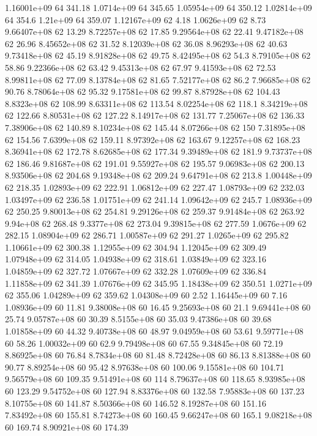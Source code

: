 1.16001e+09 64 341.18
1.0714e+09 64 345.65
1.05954e+09 64 350.12
1.02814e+09 64 354.6
1.21e+09 64 359.07
1.12167e+09 62 4.18
1.0626e+09 62 8.73
9.66407e+08 62 13.29
8.72257e+08 62 17.85
9.29564e+08 62 22.41
9.47182e+08 62 26.96
8.45652e+08 62 31.52
8.12039e+08 62 36.08
8.96293e+08 62 40.63
9.73418e+08 62 45.19
8.91828e+08 62 49.75
8.42495e+08 62 54.3
8.79105e+08 62 58.86
9.22366e+08 62 63.42
9.45313e+08 62 67.97
9.41593e+08 62 72.53
8.99811e+08 62 77.09
8.13784e+08 62 81.65
7.52177e+08 62 86.2
7.96685e+08 62 90.76
8.78064e+08 62 95.32
9.17581e+08 62 99.87
8.87928e+08 62 104.43
8.8323e+08 62 108.99
8.63311e+08 62 113.54
8.02254e+08 62 118.1
8.34219e+08 62 122.66
8.80531e+08 62 127.22
8.14917e+08 62 131.77
7.25067e+08 62 136.33
7.38906e+08 62 140.89
8.10234e+08 62 145.44
8.07266e+08 62 150
7.31895e+08 62 154.56
7.6399e+08 62 159.11
8.97392e+08 62 163.67
9.12257e+08 62 168.23
8.36941e+08 62 172.78
8.62685e+08 62 177.34
9.39489e+08 62 181.9
9.73737e+08 62 186.46
9.81687e+08 62 191.01
9.55927e+08 62 195.57
9.06983e+08 62 200.13
8.93506e+08 62 204.68
9.19348e+08 62 209.24
9.64791e+08 62 213.8
1.00448e+09 62 218.35
1.02893e+09 62 222.91
1.06812e+09 62 227.47
1.08793e+09 62 232.03
1.03497e+09 62 236.58
1.01751e+09 62 241.14
1.09642e+09 62 245.7
1.08936e+09 62 250.25
9.80013e+08 62 254.81
9.29126e+08 62 259.37
9.91484e+08 62 263.92
9.94e+08 62 268.48
9.3377e+08 62 273.04
9.39815e+08 62 277.59
1.0676e+09 62 282.15
1.08904e+09 62 286.71
1.00587e+09 62 291.27
1.0265e+09 62 295.82
1.10661e+09 62 300.38
1.12955e+09 62 304.94
1.12045e+09 62 309.49
1.07948e+09 62 314.05
1.04938e+09 62 318.61
1.03849e+09 62 323.16
1.04859e+09 62 327.72
1.07667e+09 62 332.28
1.07609e+09 62 336.84
1.11858e+09 62 341.39
1.07676e+09 62 345.95
1.18438e+09 62 350.51
1.0271e+09 62 355.06
1.04289e+09 62 359.62
1.04308e+09 60 2.52
1.16445e+09 60 7.16
1.08936e+09 60 11.81
9.38008e+08 60 16.45
9.25693e+08 60 21.1
9.69441e+08 60 25.74
9.05787e+08 60 30.39
8.5155e+08 60 35.03
9.47386e+08 60 39.68
1.01858e+09 60 44.32
9.40738e+08 60 48.97
9.04959e+08 60 53.61
9.59771e+08 60 58.26
1.00032e+09 60 62.9
9.79498e+08 60 67.55
9.34845e+08 60 72.19
8.86925e+08 60 76.84
8.7834e+08 60 81.48
8.72428e+08 60 86.13
8.81388e+08 60 90.77
8.89254e+08 60 95.42
8.97638e+08 60 100.06
9.15581e+08 60 104.71
9.56579e+08 60 109.35
9.51491e+08 60 114
8.79637e+08 60 118.65
8.93985e+08 60 123.29
9.54752e+08 60 127.94
8.83376e+08 60 132.58
7.95883e+08 60 137.23
8.10755e+08 60 141.87
8.50366e+08 60 146.52
8.19287e+08 60 151.16
7.83492e+08 60 155.81
8.74273e+08 60 160.45
9.66247e+08 60 165.1
9.08218e+08 60 169.74
8.90921e+08 60 174.39
